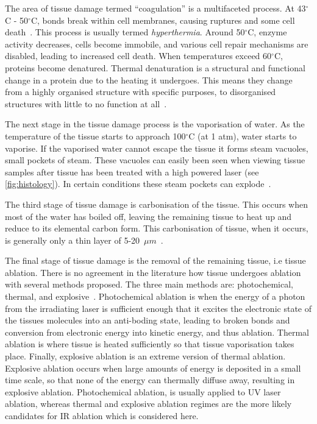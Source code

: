 The area of tissue damage termed ``coagulation'' is a multifaceted process. At 43$^{\circ}$C - 50$^{\circ}$C, bonds break within cell membranes, causing ruptures and some cell death~\cite{welch2011optical,wright2015quantitative}. This process is usually termed \textit{hyperthermia}. Around 50$^{\circ}$C, enzyme activity decreases, cells become immobile, and various cell repair mechanisms are disabled, leading to increased cell death. When temperatures exceed 60$^{\circ}$C, proteins become denatured. Thermal denaturation is a structural and functional change in a protein due to the heating it undergoes. This means they change from a highly organised structure with specific purposes, to disorganised structures with little to no function at all~\cite{niemz2013laser}.  %

The next stage in the tissue damage process is the vaporisation of water. As the temperature of the tissue starts to approach 100${^{\circ}}$C (at 1 atm), water starts to vaporise. If the vaporised water cannot escape the tissue it forms steam vacuoles, small pockets of steam. These vacuoles can easily been seen when viewing tissue samples after tissue has been treated with a high powered laser (see \cref{fig:histology}). In certain conditions these steam pockets can explode~\cite{petrella2013popcorn}.


The third stage of tissue damage is carbonisation of the tissue. This occurs when most of the water has boiled off, leaving the remaining tissue to heat up and reduce to its elemental carbon form. This carbonisation of tissue, when it occurs, is generally only a thin layer of 5-20~$\mu m$~\cite{welch2011optical,verdaasdonk1990explosive}.

The final stage of tissue damage is the removal of the remaining tissue, i.e tissue ablation. There is no agreement in the literature how tissue undergoes ablation with several methods proposed. The three main methods are: photochemical, thermal, and explosive~\cite{husinsky1990mechanisms,kitai1991physics,oraevsky1991pulsed}. 
Photochemical ablation is when the energy of a photon from the irradiating laser is sufficient enough that it excites the electronic state of the tissues molecules into an anti-boding state, leading to broken bonds and conversion from electronic energy into kinetic energy, and thus ablation.
Thermal ablation is where tissue is heated sufficiently so that tissue vaporisation takes place. 
Finally, explosive ablation is an extreme version of thermal ablation. Explosive ablation occurs when large amounts of energy is deposited in a small time scale, so that none of the energy can thermally diffuse away, resulting in explosive ablation.
Photochemical ablation, is usually applied to UV laser ablation, whereas thermal and explosive ablation regimes are the more likely candidates for IR ablation which is considered here.

